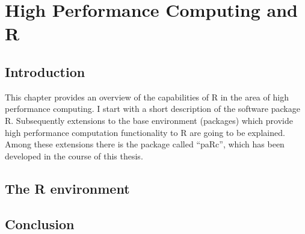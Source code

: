 \chapter{High Performance Computing and R}
\label{chap:Rhpc}
\section{Introduction}

This chapter provides an overview of the capabilities of R in the area
of high performance computing. I start with a short description of the
software package R. Subsequently extensions to the base environment
(packages) which provide high performance computation functionality to
R are going to be explained. Among these extensions there is the
package called ``paRc'', which has been developed in the course of
this thesis.

\section{The R environment}









\section{Conclusion}

